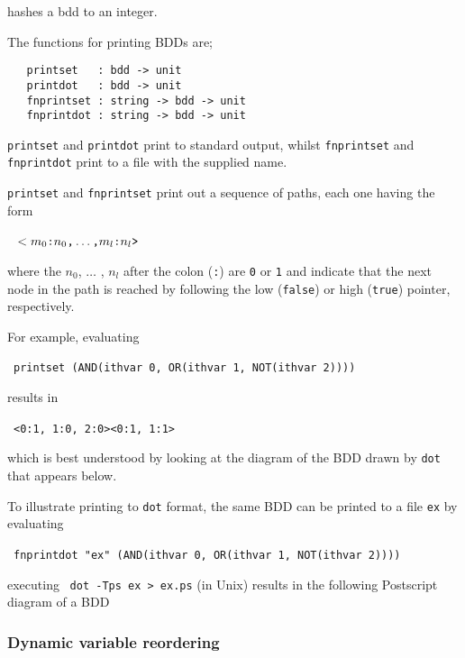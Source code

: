 \documentclass[12pt]{book}
\renewcommand{\t}[1]{\mbox{\tt #1}}
\begin{document}
hashes a bdd to an integer.

The functions for printing BDDs are;

\begin{verbatim}
   printset   : bdd -> unit
   printdot   : bdd -> unit
   fnprintset : string -> bdd -> unit
   fnprintdot : string -> bdd -> unit
\end{verbatim}

\t{printset} and \t{printdot} print to standard output, whilst
\t{fnprintset} and \t{fnprintdot} print to a file with the supplied
name.

\t{printset} and \t{fnprintset} print out a sequence of paths, each one having the form

\smallskip

~$\t{}<m_0\t{:}n_0\t{,} \ldots \t{,} m_l\t{:}n_l\t{>}$

\smallskip

where the $n_0$, $\ldots$ , $n_l$ after the colon (\t{:}) are \t{0} or
\t{1} and indicate that the next node in the path is reached by
following the low ({\t{false}}) or high ({\t{true}}) pointer,
respectively. 

For
example, evaluating

\smallskip
~\t{printset~(AND(ithvar~0,~OR(ithvar~1,~NOT(ithvar~2))))}
\smallskip

results in

\smallskip
~\t{<0:1,~1:0,~2:0><0:1,~1:1>}
\smallskip

which is best understood by looking at the diagram of the BDD drawn by
\t{dot} that appears below.

To illustrate printing to \t{dot} format,  the same BDD can be
printed to a file \t{ex} by evaluating

\smallskip
~\t{fnprintdot~"ex"~(AND(ithvar~0,~OR(ithvar~1,~NOT(ithvar~2))))}
\smallskip

executing ~\t{dot~-Tps~ex~>~ex.ps} (in Unix) results in
the following Postscript diagram of a BDD

\begin{center}
\end{center}

\subsubsection{Dynamic variable reordering}
\end{document}
